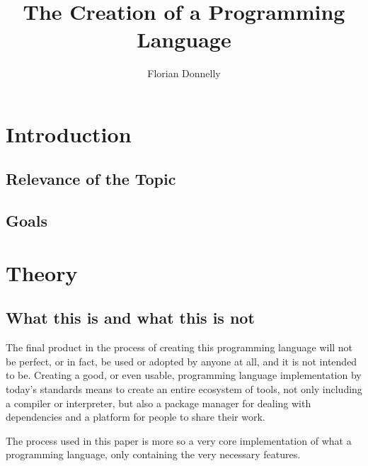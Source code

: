 \documentclass[12pt,a4paper,man]{apa7}
\author{Florian Donnelly}
\title{The Creation of a Programming Language}
\begin{document}
\onehalfspacing
\maketitle\tableofcontents\newpage

\newcommand{\name}{-the language- }

\section{Introduction}
\subsection{Relevance of the Topic}
\subsection{Goals}

\section{Theory}
\subsection{What this is and what this is not}
The final product in the process of creating this programming language will 
not be perfect, or in fact, be used or adopted by anyone at all, and it is not
intended to be. Creating a good, or even usable, programming language 
implementation by today's  standards means to create an entire ecosystem of 
tools, not only including a compiler or interpreter, but also a package manager
for dealing with dependencies and a platform for people to share their work.

The process used in this paper is more so a very core implementation of what
a programming language, only containing the very necessary features.
\end{document}

